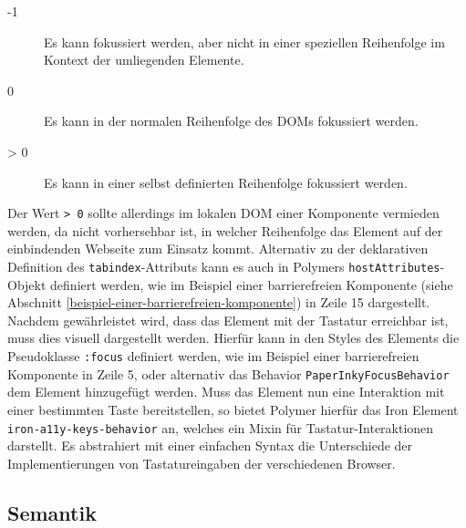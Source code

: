 \begin{description}
  \item[-1] Es kann fokussiert werden, aber nicht in einer speziellen Reihenfolge im Kontext der umliegenden Elemente.
  \item[0] Es kann in der normalen Reihenfolge des \ac{DOM}s fokussiert werden.
  \item[\textgreater{} 0] Es kann in einer selbst definierten Reihenfolge fokussiert werden.
\end{description}

Der Wert \texttt{\textgreater{}\ 0} sollte allerdings im lokalen \ac{DOM} einer Komponente vermieden werden, da nicht vorhersehbar ist, in welcher Reihenfolge das Element auf der einbindenden Webseite zum Einsatz kommt. Alternativ zu der deklarativen Definition des \texttt{tabindex}-Attributs kann es auch in Polymers \texttt{hostAttributes}-Objekt definiert werden, wie im Beispiel einer barrierefreien Komponente (siehe Abschnitt \ref{beispiel-einer-barrierefreien-komponente}) in Zeile 15 dargestellt. Nachdem gewährleistet wird, dass das Element mit der Tastatur erreichbar ist, muss dies visuell dargestellt werden. Hierfür kann in den Styles des Elements die Pseudoklasse \texttt{:focus} definiert werden, wie im Beispiel einer barrierefreien Komponente in Zeile 5, oder alternativ das Behavior \texttt{PaperInkyFocusBehavior} dem Element hinzugefügt werden. Muss das Element nun eine Interaktion mit einer bestimmten Taste bereitstellen, so bietet Polymer hierfür das Iron Element \texttt{iron-a11y-keys-behavior} an, welches ein Mixin für Tastatur-Interaktionen darstellt. Es abstrahiert mit einer einfachen Syntax die Unterschiede der Implementierungen von Tastatureingaben der verschiedenen Browser.


\subsection{Semantik}\label{semantik}

